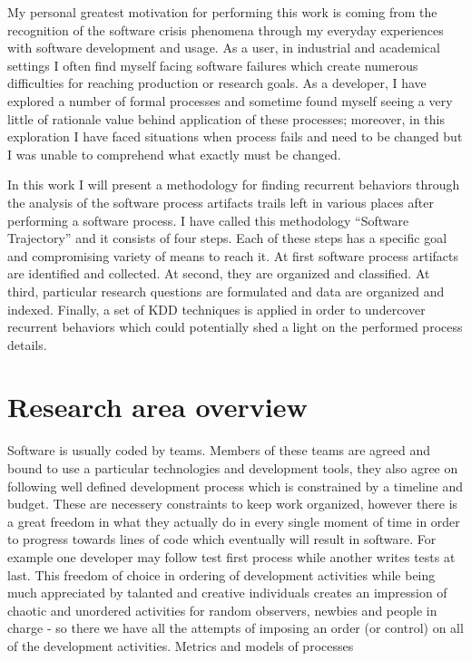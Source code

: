 My personal greatest motivation for performing this work is coming from the recognition of the 
software crisis phenomena through my everyday experiences with software development and usage. 
As a user, in industrial and academical settings I often find myself facing software failures 
which create numerous difficulties for reaching production or research goals. As a developer, 
I have explored a number of formal processes and sometime found myself seeing a very little of 
rationale value behind application of these processes; moreover, in this exploration I have 
faced situations when process fails and need to be changed but I was unable to comprehend 
what exactly must be changed. 

In this work I will present a methodology for finding recurrent behaviors through the 
analysis of the software process artifacts trails left in various places after performing a 
software process. I have called this methodology ``Software Trajectory'' and it consists 
of four steps. Each of these steps has a specific goal and compromising variety of means to
reach it. At first software process artifacts are identified and collected. At second, 
they are organized and classified. At third, particular research questions are formulated and
data are organized and indexed. Finally, a set of KDD techniques is applied in order to 
undercover recurrent behaviors which could potentially shed a light on the performed process
details. 

\section{Research area overview}
Software is usually coded by teams. Members of these teams are agreed and bound to use 
a particular technologies and development tools, they also agree on following well defined 
development process which is constrained by a timeline and budget. These are necessery 
constraints to keep work organized, however there is a great freedom in what they actually 
do in every single moment of time in order to progress towards lines of code which eventually 
will result in software. For example one developer may follow test first process while
another writes tests at last.  This freedom of choice in ordering of development activities 
while being much appreciated by talanted and creative individuals creates an impression 
of chaotic and unordered activities for random observers, newbies and people in 
charge - so there we have all the attempts of imposing an order 
(or control) on all of the development activities. Metrics and models of processes




